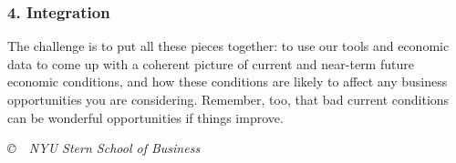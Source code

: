 \documentclass[letterpaper,12pt]{article}
\begin{document}
\subsubsection*{4. Integration}

The challenge is to put all these pieces together:
to use our tools and economic data to come up with a coherent picture of
current and near-term future economic conditions,
and how these conditions are likely to affect any business opportunities
you are considering.
Remember, too, that bad current conditions can be wonderful opportunities if things improve.

\bigskip
\vfill \centerline{\it \copyright \ \number\year \ NYU Stern School of Business}
\end{document}
